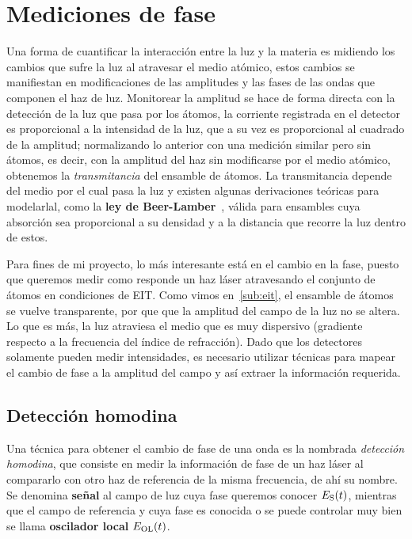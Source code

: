 \section{\label{sec:medicionesFase}Mediciones de fase}

Una forma de cuantificar la interacción entre la luz y la materia es midiendo los cambios que sufre la luz al atravesar el medio atómico, estos cambios se manifiestan en modificaciones de las amplitudes y las fases de las ondas que componen el haz de luz. Monitorear la amplitud se hace de forma directa con la detección de la luz que pasa por los átomos, la corriente registrada en el detector es proporcional a la intensidad de la luz, que a su vez es proporcional al cuadrado de la amplitud; normalizando lo anterior con una medición similar pero sin átomos, es decir, con la amplitud del haz sin modificarse por el medio atómico, obtenemos la \emph{transmitancia} del ensamble de átomos. La transmitancia depende del medio por el cual pasa la luz y existen algunas derivaciones teóricas para modelarlal, como la \textbf{ley de Beer-Lamber}~\cite{bornWolf}, válida para ensambles cuya absorción sea proporcional a su densidad y a la distancia que recorre la luz dentro de estos.

\p Para fines de mi proyecto, lo más interesante está en el cambio en la fase, puesto que queremos medir como responde un haz láser atravesando el conjunto de átomos en condiciones de EIT. Como vimos en~\ref{sub:eit}, el ensamble de átomos se vuelve transparente, por que que la amplitud del campo de la luz no se altera. Lo que es más, la luz atraviesa el medio que es muy dispersivo (gradiente respecto a la frecuencia del índice de refracción). Dado que los detectores solamente pueden medir intensidades, es necesario utilizar técnicas para mapear el cambio de fase a la amplitud del campo y así extraer la información requerida.

\subsection{\label{sub:deteccionHomodina}Detección homodina}

Una técnica para obtener el cambio de fase de una onda es la nombrada \emph{detección homodina}, que consiste en medir la información de fase de un haz láser al compararlo con otro haz de referencia de la misma frecuencia, de ahí su nombre. Se denomina \textbf{señal} al campo de luz cuya fase queremos conocer $E_{\mathrm{S}}(t)$, mientras que el campo de referencia y cuya fase es conocida o se puede controlar muy bien se llama \textbf{oscilador local} $E_{\mathrm{OL}}(t)$.

